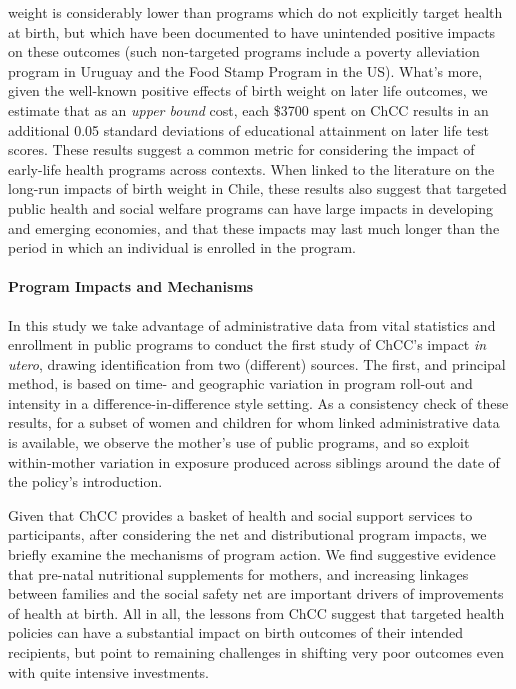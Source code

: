 \documentclass[12pt]{article}
\begin{document}
\begin{spacing}{1.4}
weight is considerably lower than programs which do not explicitly target
health at birth, but which have been documented to have unintended positive
impacts on these outcomes (such non-targeted programs include a poverty
alleviation program in Uruguay and the Food Stamp Program in the US).
What's more, given the well-known positive effects of birth weight on later
life outcomes, we estimate that as an \emph{upper bound} cost, each \$3700
spent on ChCC results in an additional 0.05 standard deviations of
educational attainment on later life test scores.  These results suggest
a common metric for considering the impact of early-life health programs
across contexts.  When linked to the literature on the long-run impacts of
birth weight in Chile, these results also suggest that targeted public
health and social welfare programs can have large impacts in developing
and emerging economies, and that these impacts may last much longer than
the period in which an individual is enrolled in the program.  

\paragraph{Program Impacts and Mechanisms}
In this study we take advantage of administrative data from vital statistics
and enrollment in public programs to conduct the first study of ChCC's
impact \emph{in utero}, drawing identification from two (different) sources.
The first, and principal method, is based on time- and geographic variation
in program roll-out and intensity in a difference-in-difference style
setting.  As a consistency check of these results, for a subset of women
and children for whom linked administrative data is available, we observe
the mother's use of public programs, and so exploit within-mother variation
in exposure produced across siblings around the date of the policy's
introduction.

Given that ChCC provides a basket of health and social support services to
participants, after considering the net and distributional program impacts,
we briefly examine the mechanisms of program action.  We find suggestive
evidence that pre-natal nutritional supplements
for mothers, and increasing linkages between families and the social
safety net are important drivers of improvements of health at birth.
All in all, the lessons from ChCC suggest that targeted health policies
can have a substantial impact on birth outcomes of their intended
recipients, but point to remaining challenges in shifting very poor
outcomes even with quite intensive investments.  


\end{spacing}
\end{document}
